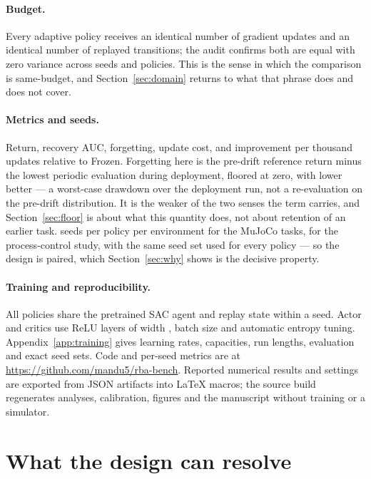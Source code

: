 \documentclass{article}
\begin{document}
\paragraph{Budget.} Every adaptive policy receives an identical number of
gradient updates and an identical number of replayed transitions; the audit
confirms both are equal with zero variance across seeds and policies. This is
the sense in which the comparison is same-budget, and Section~\ref{sec:domain}
returns to what that phrase does and does not cover.

\paragraph{Metrics and seeds.} Return, recovery AUC, forgetting, update cost,
and improvement per thousand updates relative to Frozen. Forgetting here is the
pre-drift reference return minus the lowest periodic evaluation during
deployment, floored at zero, with lower better --- a worst-case drawdown over
the deployment run, not a re-evaluation on the pre-drift distribution. It is the
weaker of the two senses the term carries, and Section~\ref{sec:floor} is
about what this quantity does, not about retention of an earlier task.
\SeedsHopper{} seeds per policy per environment for the MuJoCo tasks,
\SeedsPcgym{} for the
process-control study, with the same seed set used for every policy --- so the
design is paired, which Section~\ref{sec:why} shows is the decisive property.

\paragraph{Training and reproducibility.} All policies share the pretrained
SAC agent and replay state within a seed. Actor and critics use
\HiddenLayers{} ReLU layers of width \HiddenWidth{}, batch size
\TrainBatch{} and automatic entropy tuning. Appendix~\ref{app:training}
gives learning rates, capacities, run lengths, evaluation and exact seed sets.
Code and per-seed metrics are at
\url{https://github.com/mandu5/rba-bench}. Reported numerical results and
settings are exported from JSON artifacts into \LaTeX{} macros; the source
build regenerates analyses, calibration, figures and the manuscript without
training or a simulator.

\section{What the design can resolve}
\label{sec:resolvable}
\end{document}
